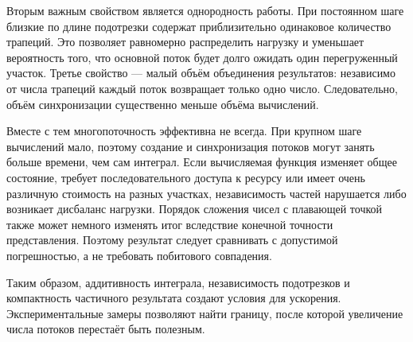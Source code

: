 Вторым важным свойством является однородность работы. При постоянном шаге близкие по длине подотрезки содержат приблизительно одинаковое количество трапеций. Это позволяет равномерно распределить нагрузку и уменьшает вероятность того, что основной поток будет долго ожидать один перегруженный участок. Третье свойство --- малый объём объединения результатов: независимо от числа трапеций каждый поток возвращает только одно число. Следовательно, объём синхронизации существенно меньше объёма вычислений.

Вместе с тем многопоточность эффективна не всегда. При крупном шаге вычислений мало, поэтому создание и синхронизация потоков могут занять больше времени, чем сам интеграл. Если вычисляемая функция изменяет общее состояние, требует последовательного доступа к ресурсу или имеет очень различную стоимость на разных участках, независимость частей нарушается либо возникает дисбаланс нагрузки. Порядок сложения чисел с плавающей точкой также может немного изменять итог вследствие конечной точности представления. Поэтому результат следует сравнивать с допустимой погрешностью, а не требовать побитового совпадения.

Таким образом, аддитивность интеграла, независимость подотрезков и компактность частичного результата создают условия для ускорения. Экспериментальные замеры позволяют найти границу, после которой увеличение числа потоков перестаёт быть полезным.
